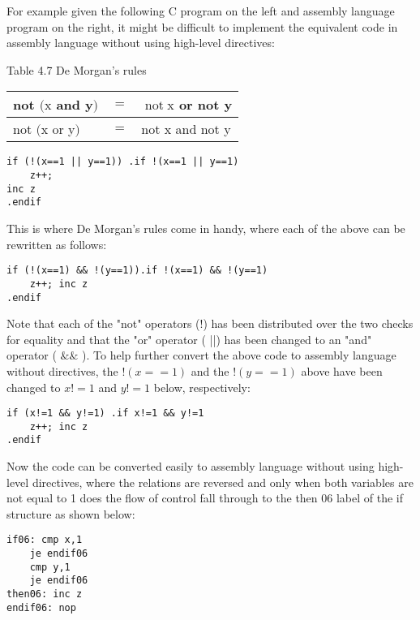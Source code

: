 \documentclass[10pt]{article}
\begin{document}
For example given the following C program on the left and assembly language program on the right, it might be difficult to implement the equivalent code in assembly language without using high-level directives:

Table 4.7 De Morgan's rules

\begin{center}
\begin{tabular}{l|l|l|}
\hline
not $(\mathrm{x}$ and y$)$ & $=$ & $\operatorname{not} \mathrm{x}$ or not y \\
\hline
not $(\mathrm{x}$ or y$)$ & $=$ & not x and not y \\
\hline
\end{tabular}
\end{center}

\begin{verbatim}
if (!(x==1 || y==1)) .if !(x==1 || y==1)
    z++;
inc z
.endif
\end{verbatim}

This is where De Morgan's rules come in handy, where each of the above can be rewritten as follows:

\begin{verbatim}
if (!(x==1) && !(y==1)).if !(x==1) && !(y==1)
    z++; inc z
.endif
\end{verbatim}

Note that each of the "not" operators (!) has been distributed over the two checks for equality and that the "or" operator ( ||) has been changed to an "and" operator ( $\& \&$ ). To help further convert the above code to assembly language without directives, the $!(x==1)$ and the $!(y==1)$ above have been changed to $x!=1$ and $y!=1$ below, respectively:

\begin{verbatim}
if (x!=1 && y!=1) .if x!=1 && y!=1
    z++; inc z
.endif
\end{verbatim}

Now the code can be converted easily to assembly language without using high-level directives, where the relations are reversed and only when both variables are not equal to 1 does the flow of control fall through to the then 06 label of the if structure as shown below:

\begin{verbatim}
if06: cmp x,1
    je endif06
    cmp y,1
    je endif06
then06: inc z
endif06: nop
\end{verbatim}
\end{document}
